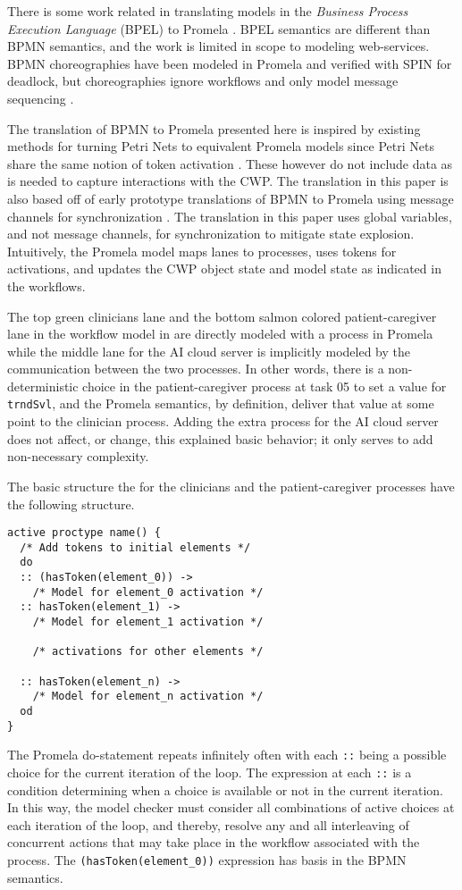 There is some work related in translating models in the \emph{Business Process Execution Language} (BPEL) to Promela \cite{bpelToPromela}. BPEL semantics are different than BPMN semantics, and the work is limited in scope to modeling web-services. BPMN choreographies have been modeled in Promela and verified with SPIN for deadlock, but choreographies ignore workflows and only model message sequencing \cite{choreography}.

The translation of BPMN to Promela presented here is inspired by existing methods for turning Petri Nets to equivalent Promela models since Petri Nets share the same notion of token activation \cite{petrinetToPromela, petrinetInspiration}. These however do not include data as is needed to capture interactions with the CWP. The translation in this paper is also based off of early prototype translations of BPMN to Promela using message channels for synchronization \cite{bpmn2promela}. The translation in this paper uses global variables, and not message channels, for synchronization to mitigate state explosion.   Intuitively, the Promela model maps lanes to processes, uses tokens for activations, and updates the CWP object state and model state as indicated in the workflows.

The top green clinicians lane and the bottom salmon colored patient-caregiver lane in the workflow model in  are directly modeled with a process in Promela while the middle lane for the AI cloud server is implicitly modeled by the communication between the two processes. In other words, there is a non-deterministic choice in the patient-caregiver process at task 05 to set a value for \texttt{trndSvl}, and the Promela semantics, by definition, deliver that value at some point to the clinician process. Adding the extra process for the AI cloud server does not affect, or change, this explained basic behavior; it only serves to add non-necessary complexity.

The basic structure the for the clinicians and the patient-caregiver processes have the following structure.
%
{\small
\begin{lstlisting}[style=myPromela]
active proctype name() {
  /* Add tokens to initial elements */
  do
  :: (hasToken(element_0)) ->
    /* Model for element_0 activation */
  :: hasToken(element_1) ->
    /* Model for element_1 activation */
 
    /* activations for other elements */
    
  :: hasToken(element_n) ->
    /* Model for element_n activation */
  od
}
\end{lstlisting}
}
%
\noindent The Promela do-statement repeats infinitely often with each \texttt{::} being a possible choice for the current iteration of the loop. The expression at each \texttt{::} is a condition determining when a choice is available or not in the current iteration. In this way, the model checker must consider all combinations of active choices at each iteration of the loop, and thereby, resolve any and all interleaving of concurrent actions that may take place in the workflow associated with the process. The \texttt{(hasToken(element\_0))} expression has basis in the BPMN semantics.

